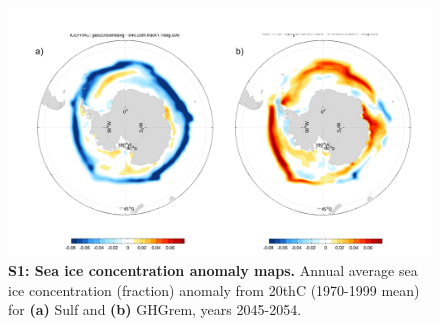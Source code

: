 \documentclass{nature}
\begin{document}
\begin{figure}%
\noindent\includegraphics[width=39pc]{figures/SuppFig1.pdf}  %
\caption{\textbf{S1: Sea ice concentration anomaly maps.} Annual average sea ice concentration (fraction) anomaly from 20thC (1970-1999 mean) for \textbf{(a)} Sulf and \textbf{(b)} GHGrem, years 2045-2054.}
\label{fig:supp2}
\end{figure}
\end{document}
